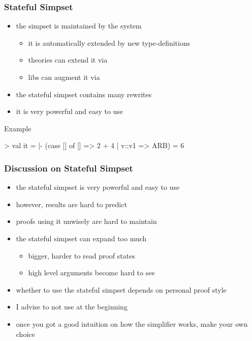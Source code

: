 \begin{frame}[fragile]
\frametitle{Stateful Simpset}

\begin{itemize}
\item the simpset  is maintained by the system
\begin{itemize}
\item it is automatically extended by new type-definitions
\item theories can extend it via 
\item libs can augment it via 
\end{itemize}
\item the stateful simpset contains many rewrites
\item it is very powerful and easy to use
\end{itemize}

\begin{exampleblock}{Example}
\begin{semiverbatim}\scriptsize
> 
val it = |- (case [] of [] => 2 + 4 | v::v1 => ARB) = 6
\end{semiverbatim}
\end{exampleblock}
\end{frame}


\begin{frame}
\frametitle{Discussion on Stateful Simpset}

\begin{itemize}
\item the stateful simpset is very powerful and easy to use
\item however, results are hard to predict
\item proofs using it unwisely are hard to maintain
\item the stateful simpset can expand too much
\begin{itemize}
\item bigger, harder to read proof states
\item high level arguments become hard to see
\end{itemize}
\item whether to use the stateful simpset depends on personal proof style
\item I advise to not use  at the beginning
\item once you got a good intuition on how the simplifier works, make your own choice
\end{itemize}
\end{frame}


